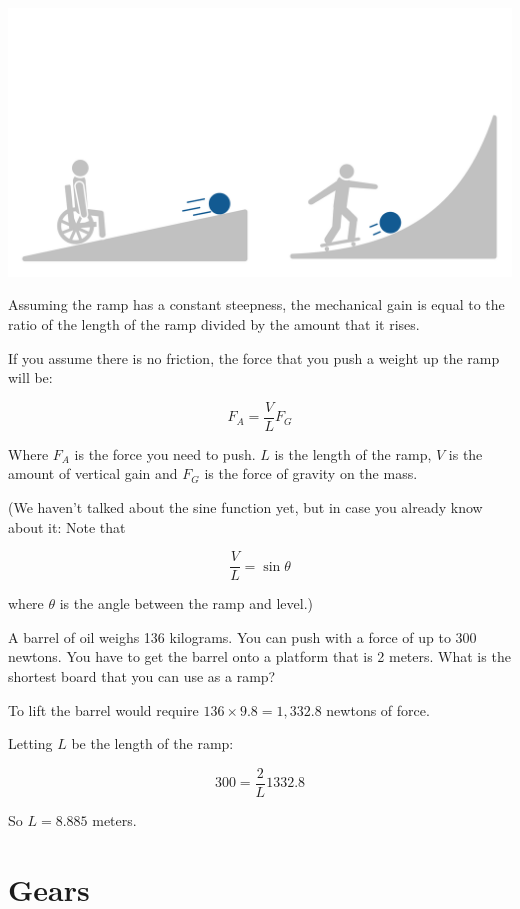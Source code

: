 \includegraphics[width=1\textwidth]{rampcomparison.png}

Assuming the ramp has a constant steepness, the mechanical gain is
equal to the ratio of the length of the ramp divided by the amount
that it rises.

If you assume there is no friction, the force that you push a weight up the ramp will be:

$$F_A = \frac{V}{L} F_G$$

Where $F_A$ is the force you need to push. $L$ is the length of the
ramp, $V$ is the amount of vertical gain and $F_G$ is the force of
gravity on the mass.

(We haven't talked about the sine function yet, but in case you already know about it: Note that

$$\frac{V}{L} = \sin{\theta}$$

where $\theta$ is the angle between the ramp and level.)

\begin{Exercise}[title={Ramp}, label=ramp]
A barrel of oil weighs 136 kilograms. You can push with a force of
up to 300 newtons. You have to get the barrel onto a platform that is 2
meters. What is the shortest board that you can use as a ramp?
\end{Exercise}
\begin{Answer}[ref=ramp]
  To lift the barrel would require $136 \times 9.8 = 1,332.8$ newtons of force.

  Letting $L$ be the length of the ramp:

  $$300= \frac{2}{L} 1332.8$$

  So $L = 8.885$ meters.
\end{Answer}

\section{Gears}


